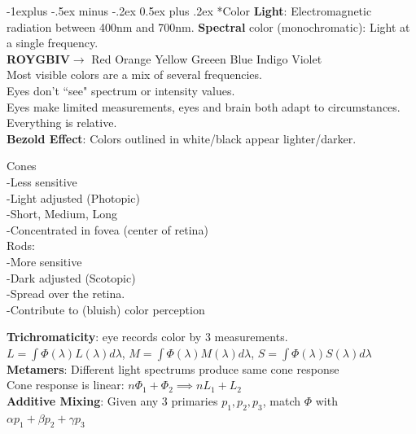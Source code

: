 \documentclass[3pt,landscape]{article}
\makeatletter
\renewcommand{\subsection}{\@startsection{subsection}{2}{0mm}%
                            {-1explus -.5ex minus -.2ex}%
                            {0.5ex plus .2ex}%
                            {\normalfont\normalsize\bfseries}}
\makeatother
\begin{document}
\begin{multicols}{3}
\subsection*{Color}
{\bf Light}: Electromagnetic radiation between 400nm and 700nm.
{\bf Spectral} color (monochromatic): Light at a single frequency.\\
{\bf ROYGBIV}\(\rightarrow\) Red Orange Yellow Greeen Blue Indigo Violet\\
Most visible colors are a mix of several frequencies.\\
Eyes don't ``see" spectrum or intensity values.\\
Eyes make limited measurements, eyes and brain both adapt to circumstances. Everything is relative.\\
{\bf Bezold Effect}: Colors outlined in white/black appear lighter/darker.
\begin{multicols}{2}
\center
Cones\\
-Less sensitive\\
-Light adjusted (Photopic)\\
-Short, Medium, Long\\
-Concentrated in fovea (center of retina)\\
\columnbreak
Rods:\\
-More sensitive\\
-Dark adjusted (Scotopic)\\
-Spread over the retina.\\
-Contribute to (bluish) color perception
\end{multicols}
{\bf Trichromaticity}: eye records color by 3 measurements.\\
\(L = \int\Phi(\lambda)L(\lambda)d\lambda\), 
\(M = \int\Phi(\lambda)M(\lambda)d\lambda\), 
\(S = \int\Phi(\lambda)S(\lambda)d\lambda\)\\
{\bf Metamers}: Different light spectrums produce same cone response\\
Cone response is linear: \(n\Phi_1+\Phi_2 \implies nL_1+L_2\)\\
{\bf Additive Mixing}: Given any 3 primaries \(p_1,p_2,p_3\), match \(\Phi\) with \(\alpha p_1 + \beta p_2 + \gamma p_3\)\\

\end{multicols}
\end{document}
